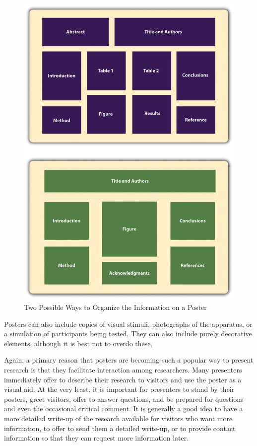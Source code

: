\begin{figure}




\includegraphics[width=\linewidth]{figures/C11posters}




\caption{Two Possible Ways to Organize the Information on a Poster}




\label{fig:posters}
\end{figure}

Posters can also include copies of visual stimuli, photographs of the apparatus, or a simulation of participants being tested. They can also include purely decorative elements, although it is best not to overdo these.


Again, a primary reason that posters are becoming such a popular way to present research is that they facilitate interaction among researchers. Many presenters immediately offer to describe their research to visitors and use the poster as a visual aid. At the very least, it is important for presenters to stand by their posters, greet visitors, offer to answer questions, and be prepared for questions and even the occasional critical comment. It is generally a good idea to have a more detailed write-up of the research available for visitors who want more information, to offer to send them a detailed write-up, or to provide contact information so that they can request more information later.


